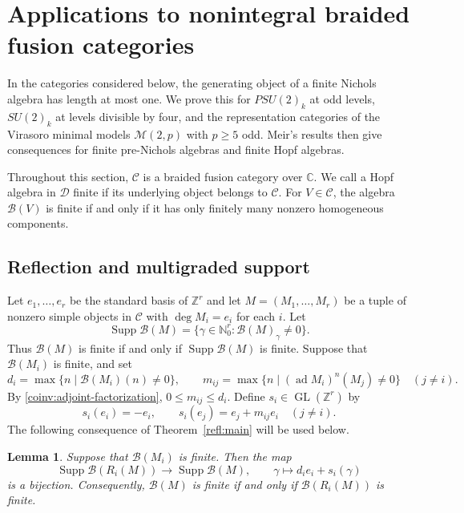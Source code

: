 \documentclass[11pt, a4paper]{article}
\numberwithin{equation}{section}
\newcommand{\C}{\mathcal C}
\newcommand{\D}{\mathcal D}
\newcommand{\B}{\mathcal B}
\DeclareMathOperator{\ad}{ad}
\newtheorem{lemma}[theorem]{Lemma}
\begin{document}
\section{Applications to nonintegral braided fusion categories}
\label{sec:examples}

 {In the categories considered below, the generating object
of a finite Nichols algebra has length at most one.
We prove this for $PSU(2)_k$ at odd levels,
$SU(2)_k$ at levels divisible by four, and the representation
categories of the Virasoro minimal models $\mathcal M(2,p)$ with
$p\ge5$ odd. Meir's results then give consequences for finite
pre-Nichols algebras and finite Hopf algebras.}

Throughout this section, $\C$ is a braided fusion category over
$\mathbb C$. We call a Hopf algebra in $\D$ finite if its underlying
object belongs to $\C$. For $V\in\C$, the algebra $\B(V)$ is finite
if and only if it has only finitely many nonzero homogeneous components.

\subsection{Reflection and multigraded support}
Let $e_1,\dots, e_r$ be the standard basis of $\mathbb{Z}^{r}$ and
let $M=(M_1,\ldots,M_r)$ be a tuple of nonzero simple objects in $\mathcal{C}$ with $\operatorname{deg}M_i=e_i$ for each $i$. Let
\[
 {\operatorname{Supp}\B(M)}=\{\gamma\in\mathbb N_0^r:\B(M)_\gamma\ne0\}.
\]
Thus $\B(M)$ is finite if and only if ${\operatorname{Supp}\B(M)}$ is finite. Suppose
that $\B(M_i)$ is finite, and set
\[
 d_i=\max\{n\mid \B(M_i)(n)\ne0\},\qquad
 m_{ij}=\max\{n\mid (\ad M_i)^n(M_j)\ne0\}\quad(j\ne i).
\]
By \eqref{coinv:adjoint-factorization}, $0\le m_{ij}\le d_i$. Define
$s_i\in\operatorname{GL}(\mathbb Z^r)$ by
\[
 s_i(e_i)=-e_i,\qquad s_i(e_j)=e_j+m_{ij}e_i\quad(j\ne i).
\]
The following consequence of Theorem~\ref{refl:main} will be
used below.
\begin{lemma}\label{app:support}
Suppose that $\B(M_i)$ is finite. Then the map
\begin{equation}\label{app:support-identity}
 {\operatorname{Supp}\B(R_i(M))}\longrightarrow {\operatorname{Supp}\B(M)},\qquad
 \gamma\longmapsto d_i e_i+s_i(\gamma)
\end{equation}
is a bijection. Consequently, $\B(M)$ is finite if and only if
$\B(R_i(M))$ is finite.
\end{lemma}
\end{document}
